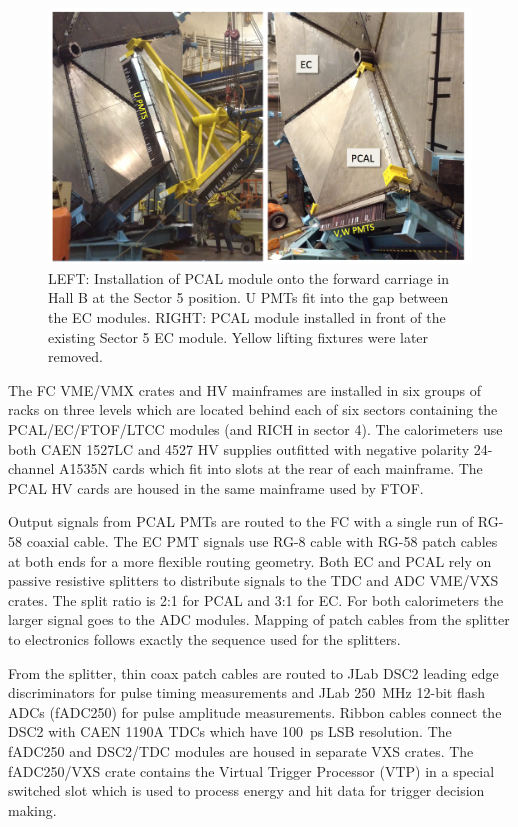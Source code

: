 \begin{figure}[hbt]
\centering
\includegraphics[width=0.95\columnwidth,keepaspectratio]{img/S5_1.png}
\caption{LEFT: Installation of PCAL module onto the forward carriage in Hall B at the Sector 5 position. U PMTs fit into the gap between the EC modules. RIGHT: PCAL module installed in front of the existing Sector 5 EC module. Yellow lifting fixtures were later removed. }
\label{fig:S5_1}
\end{figure}

The FC VME/VMX crates and HV mainframes are installed in six groups of racks on three levels which are located behind each of six sectors containing the PCAL/EC/FTOF/LTCC modules (and RICH in sector 4).  
The calorimeters use both CAEN 1527LC and 4527 HV supplies
outfitted with negative polarity 24-channel A1535N cards which fit into slots at the rear of each
mainframe. The PCAL HV cards are housed in the same mainframe used by FTOF.  

Output signals from PCAL PMTs are routed to the FC with a single run of RG-58 coaxial cable. The EC PMT signals use RG-8 cable with RG-58 patch cables at both ends for a more flexible routing geometry.  Both EC and PCAL rely on passive resistive splitters to distribute signals to the TDC and ADC VME/VXS crates.  The split ratio is 2:1 for PCAL and 3:1 for EC.  For both calorimeters the larger signal goes to the ADC modules.  Mapping of patch cables from the splitter to electronics follows exactly the sequence used for the splitters.

From the splitter, thin coax patch cables are routed to JLab DSC2 leading edge discriminators for pulse timing measurements and JLab 250~MHz 12-bit flash ADCs (fADC250) for pulse amplitude measurements.  Ribbon cables connect the DSC2 with CAEN 1190A TDCs which have 100~ps LSB resolution. The fADC250 and DSC2/TDC modules are housed in separate VXS crates.  The fADC250/VXS crate contains the
Virtual Trigger Processor (VTP) in a special switched slot which is used to process energy and hit data for
trigger decision making.





